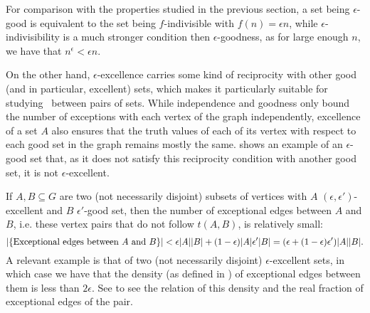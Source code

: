         \begin{remark}
            For comparison with the properties studied in the previous section, a set being $\epsilon$-good is equivalent to the
            set being $f$-indivisible with $f(n) = \epsilon n$, while $\epsilon$-indivisibility is a much stronger condition then
            $\epsilon$-goodness, as for large enough $n$, we have that $n^\epsilon < \epsilon n$.

            On the other hand, $\epsilon$-excellence carries some kind of reciprocity with other good (and in particular,
            excellent) sets, which makes it particularly suitable for studying \regularity~between pairs of sets.
            While independence and goodness only bound the number of exceptions with each vertex of the graph independently,
            excellence of a set $A$ also ensures that the truth values of each of its vertex with respect to each
            good set in the graph remains mostly the same.
             shows an example of an $\epsilon$-good set that, as it does not satisfy this
            reciprocity condition with another good set, it is not $\epsilon$-excellent. 
        \end{remark}

        \begin{remark} \label{rmk:excellence_imply_little_exceptions}
            If $A, B \subseteq G$ are two (not necessarily disjoint) subsets of vertices
            with $A$ $(\epsilon, \epsilon')$-excellent and $B$ $\epsilon'$-good set, then the number of exceptional edges between $A$ and $B$,
            i.e. these vertex pairs that do not follow $t(A,B)$, is relatively small:
            \[
                | \{ \text{Exceptional edges between } A \text{ and } B \} | <
                    \epsilon |A| |B| + (1- \epsilon) |A| \epsilon' |B| = ( \epsilon + ( 1-\epsilon ) \epsilon' ) |A| |B|.
            \]
            A relevant example is that of two (not necessarily disjoint) $\epsilon$-excellent sets, in which case we have that
            the density (as defined in ) of exceptional edges between them is less than $2\epsilon$.
            See  to see the relation of this density and the real fraction of exceptional
            edges of the pair.
        \end{remark}

